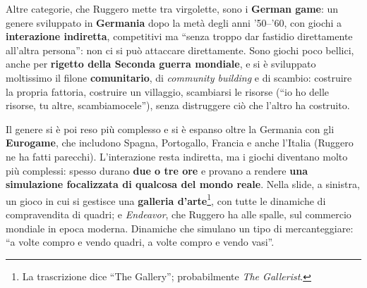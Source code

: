 Altre categorie, che Ruggero mette tra virgolette, sono i \textbf{German game}:
un genere sviluppato in \textbf{Germania} dopo la metà degli anni '50--'60, con
giochi a \textbf{interazione indiretta}, competitivi ma ``senza troppo dar
fastidio direttamente all'altra persona'': non ci si può attaccare
direttamente. Sono giochi poco bellici, anche per \textbf{rigetto della Seconda
guerra mondiale}, e si è sviluppato moltissimo il filone \textbf{comunitario}, di
\emph{community building} e di scambio: costruire la propria fattoria, costruire
un villaggio, scambiarsi le risorse (``io ho delle risorse, tu altre,
scambiamocele''), senza distruggere ciò che l'altro ha costruito.

Il genere si è poi reso più complesso e si è espanso oltre la Germania con gli
\textbf{Eurogame}, che includono Spagna, Portogallo, Francia e anche l'Italia
(Ruggero ne ha fatti parecchi). L'interazione resta indiretta, ma i giochi
diventano molto più complessi: spesso durano \textbf{due o tre ore} e provano a
rendere \textbf{una simulazione focalizzata di qualcosa del mondo reale}. Nella
slide, a sinistra, un gioco in cui si gestisce una \textbf{galleria
d'arte}\footnote{La trascrizione dice ``The Gallery''; probabilmente \emph{The
Gallerist}.}, con tutte le dinamiche di compravendita di quadri; e
\emph{Endeavor}, che Ruggero ha alle spalle, sul commercio mondiale in epoca
moderna. Dinamiche che simulano un tipo di mercanteggiare: ``a volte compro e
vendo quadri, a volte compro e vendo vasi''.

